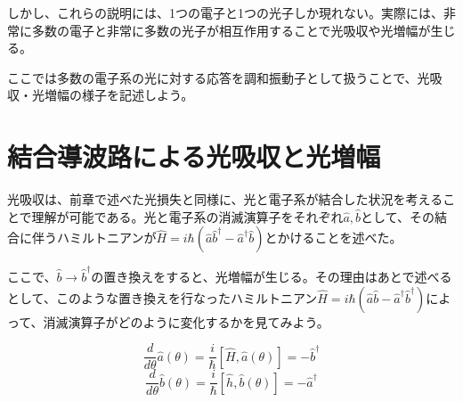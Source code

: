 しかし、これらの説明には、1つの電子と1つの光子しか現れない。実際には、非常に多数の電子と非常に多数の光子が相互作用することで光吸収や光増幅が生じる。

ここでは多数の電子系の光に対する応答を調和振動子として扱うことで、光吸収・光増幅の様子を記述しよう。

\section{結合導波路による光吸収と光増幅}
光吸収は、前章で述べた光損失と同様に、光と電子系が結合した状況を考えることで理解が可能である。光と電子系の消滅演算子をそれぞれ$\hat a, \hat b$として、その結合に伴うハミルトニアンが$\hat H = i\hbar (\hat a \hat b^\dagger - \hat a^\dagger \hat b)$とかけることを述べた。


ここで、$\hat b \to \hat b^\dagger$の置き換えをすると、光増幅が生じる。その理由はあとで述べるとして、このような置き換えを行なったハミルトニアン$\hat H = i\hbar (\hat a \hat b - \hat a^\dagger \hat b^\dagger)$によって、消滅演算子がどのように変化するかを見てみよう。

\begin{equation}
  \frac{d}{d\theta}\hat a(\theta) = \frac{i}{\hbar}[\hat H, \hat a(\theta)] = -\hat b^\dagger
\end{equation}
\begin{equation}
  \frac{d}{d\theta}\hat b(\theta) = \frac{i}{\hbar}[\hat h, \hat b(\theta)] = -\hat a^\dagger
\end{equation}

